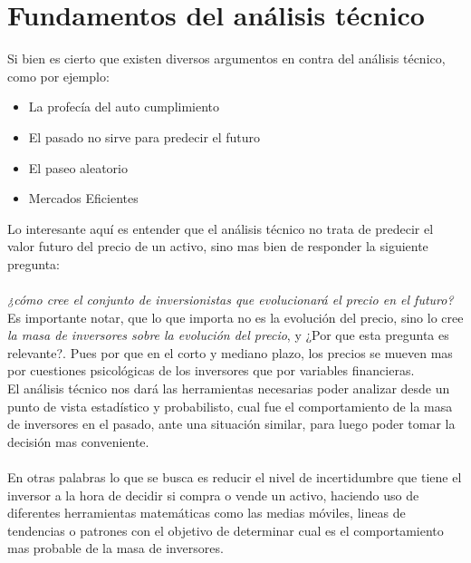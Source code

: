 \section{Fundamentos del análisis técnico}

Si bien es cierto que existen diversos argumentos en contra del análisis técnico, como por ejemplo:

\begin{itemize}
	\item La profecía del auto cumplimiento
	\item El pasado no sirve para predecir el futuro
	\item El paseo aleatorio
	\item Mercados Eficientes
\end{itemize}

Lo interesante aquí es entender que el análisis técnico no trata de predecir el valor futuro del precio de un activo, sino mas bien de responder la siguiente pregunta:\\\\

\emph{¿cómo cree el conjunto de inversionistas que evolucionará el precio en el futuro? }
\\

Es importante notar, que lo que importa no es la evolución del precio, sino lo cree \emph{la masa de inversores sobre la evolución del precio}, y ¿Por que esta pregunta es relevante?. Pues por que en el corto y mediano plazo, los precios se mueven mas por cuestiones psicológicas de los inversores que por variables financieras.\\

El análisis técnico nos dará las herramientas necesarias poder analizar desde un punto de vista estadístico y probabilisto, cual fue el comportamiento de la masa de inversores en el pasado, ante una situación similar, para luego poder tomar la decisión mas conveniente.
\\\\
En otras palabras lo que se busca es reducir el nivel de incertidumbre que tiene el inversor a la hora de decidir si compra o vende un activo, haciendo uso de diferentes herramientas matemáticas como las medias móviles, lineas de tendencias o patrones con el objetivo de determinar cual es el comportamiento mas probable de la masa de inversores.


